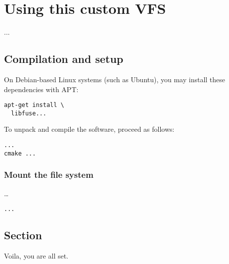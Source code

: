 \chapter{Using this custom VFS}

...

\section*{Compilation and setup}

On Debian-based Linux systems (such as Ubuntu), you may install these dependencies with APT:

\begin{Verbatim}
apt-get install \
  libfuse...
\end{Verbatim}

To unpack and compile the software, proceed as follows:

\begin{Verbatim}
...
cmake ...
\end{Verbatim}

\subsection*{Mount the file system}

\ldots

\begin{Verbatim}
...
\end{Verbatim}

\section*{Section}

Voila, you are all set.